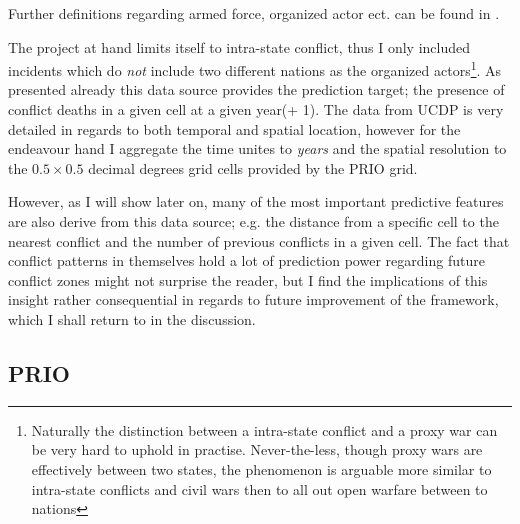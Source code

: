 \documentclass[a4paper]{article}
\begin{document}
Further definitions regarding armed force, organized actor ect. can be found in \cite[10-11]{Croicu_Sundberg_2017}.\par 

The project at hand limits itself to intra-state conflict, thus I only included incidents which do \emph{not} include two different nations as the organized actors\footnote{ Naturally the distinction between a intra-state conflict and a proxy war can be very hard to uphold in practise. Never-the-less, though proxy wars are effectively between two states, the phenomenon is arguable more similar to intra-state conflicts and civil wars then to all out open warfare between to nations}. As presented already this data source provides the prediction target; the presence of conflict deaths in a given cell at a given year(+ 1). The data from UCDP is very detailed in regards to both temporal and spatial location, however for the endeavour hand I aggregate the time unites to \emph{years} and the spatial resolution to the $0.5\times0.5$ decimal degrees grid cells provided by the PRIO grid.\par

However, as I will show later on, many of the most important predictive features are also derive from this data source; e.g. the distance from a specific cell to the nearest conflict and the number of previous conflicts in a given cell. The fact that conflict patterns in themselves hold a lot of prediction power regarding future conflict zones might not surprise the reader, but I find the implications of this insight rather consequential in regards to future improvement of the framework, which I shall return to in the discussion.\par

\subsection{PRIO}
\end{document}

